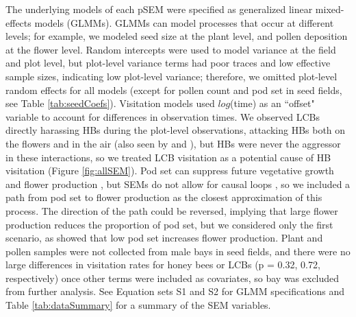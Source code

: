\documentclass[12pt]{article} %
\begin{document}
The underlying models of each pSEM were specified as generalized linear mixed-effects models (GLMMs).
GLMMs can model processes that occur at different levels; for example, we modeled seed size at the plant level, and pollen deposition at the flower level.
Random intercepts were used to model variance at the field and plot level, but plot-level variance terms had poor traces and low effective sample sizes, indicating low plot-level variance; therefore, we omitted plot-level random effects for all models (except for pollen count and pod set in seed fields, see Table \ref{tab:seedCoefs}).
Visitation models used $log$(time) as an ``offset" variable to account for differences in observation times.
We observed LCBs directly harassing HBs during the plot-level observations, attacking HBs both on the flowers and in the air (also seen by \citealp{batra1978} and \citealp{waytes2022}), but HBs were never the aggressor in these interactions, so we treated LCB visitation as a potential cause of HB visitation (Figure \ref{fig:allSEM}).
Pod set can suppress future vegetative growth and flower production \citep{stephenson1981}, but SEMs do not allow for causal loops \citep{grace2012}, so we included a path from pod set to flower production as the closest approximation of this process.
The direction of the path could be reversed, implying that large flower production reduces the proportion of pod set, but we considered only the first scenario, as \citet{sabbahi2006} showed that low pod set increases flower production.
Plant and pollen samples were not collected from male bays in seed fields, and there were no large differences in visitation rates for honey bees or LCBs (p = 0.32, 0.72, respectively) once other terms were included as covariates, so bay was excluded from further analysis.
See Equation sets S1 and S2 for GLMM specifications and Table \ref{tab:dataSummary} for a summary of the SEM variables.
\end{document}
